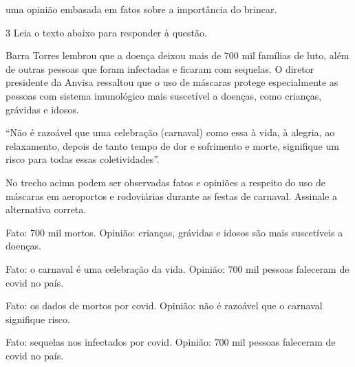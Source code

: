 {\begin{escolha}
  \item uma opinião embasada em fatos sobre a importância do brincar.

\end{escolha}

\num{3} Leia o texto abaixo para responder à questão.

\begin{myquote}

Barra Torres lembrou que a doença deixou mais de 700 mil famílias de
luto, além de outras pessoas que foram infectadas e ficaram com
sequelas. O diretor presidente da Anvisa ressaltou que o uso de máscaras
protege especialmente as pessoas com sistema imunológico mais suscetível
a doenças, como crianças, grávidas e idosos.  

``Não é razoável que uma celebração (carnaval) como essa à vida, à
alegria, ao relaxamento, depois de tanto tempo de dor e sofrimento e
morte, signifique um risco para todas essas coletividades''.

\end{myquote}


No trecho acima podem ser observadas fatos e opiniões a respeito do uso
de máscaras em aeroportos e rodoviárias durante as festas de carnaval.
Assinale a alternativa correta.

\begin{escolha}

  \item Fato: 700 mil mortos. Opinião: crianças, grávidas e idosos são mais suscetíveis a doenças.

  \item Fato: o carnaval é uma celebração da vida. Opinião: 700 mil pessoas faleceram de covid no país.
  
  \item Fato: os dados de mortos por covid. Opinião: não é razoável que o carnaval signifique risco.
  
  \item Fato: sequelas nos infectados por covid. Opinião: 700 mil pessoas faleceram de covid no país.

\end{escolha}


}
